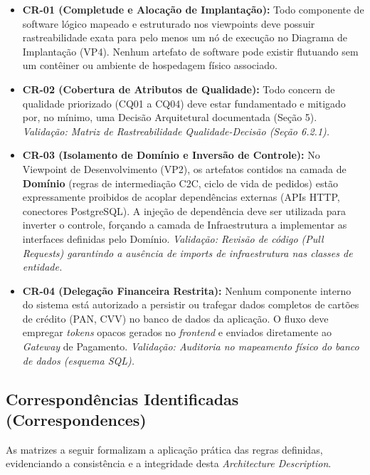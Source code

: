 \documentclass[12pt, a4paper]{article}
\begin{document}
\begin{itemize}[noitemsep]
    \item \textbf{CR-01 (Completude e Alocação de Implantação):} Todo componente de software lógico mapeado e estruturado nos viewpoints deve possuir rastreabilidade exata para pelo menos um nó de execução no Diagrama de Implantação (VP4). Nenhum artefato de software pode existir flutuando sem um contêiner ou ambiente de hospedagem físico associado. 
    
    \item \textbf{CR-02 (Cobertura de Atributos de Qualidade):} Todo concern de qualidade priorizado (CQ01 a CQ04) deve estar fundamentado e mitigado por, no mínimo, uma Decisão Arquitetural documentada (Seção 5). 
    \textit{Validação: Matriz de Rastreabilidade Qualidade-Decisão (Seção 6.2.1).}
    
    \item \textbf{CR-03 (Isolamento de Domínio e Inversão de Controle):} No Viewpoint de Desenvolvimento (VP2), os artefatos contidos na camada de \textbf{Domínio} (regras de intermediação C2C, ciclo de vida de pedidos) estão expressamente proibidos de acoplar dependências externas (APIs HTTP, conectores PostgreSQL). A injeção de dependência deve ser utilizada para inverter o controle, forçando a camada de Infraestrutura a implementar as interfaces definidas pelo Domínio.
    \textit{Validação: Revisão de código (\textit{Pull Requests}) garantindo a ausência de \textit{imports} de infraestrutura nas classes de entidade.}
    
    \item \textbf{CR-04 (Delegação Financeira Restrita):} Nenhum componente interno do sistema está autorizado a persistir ou trafegar dados completos de cartões de crédito (PAN, CVV) no banco de dados da aplicação. O fluxo deve empregar \textit{tokens} opacos gerados no \textit{frontend} e enviados diretamente ao \textit{Gateway} de Pagamento.
    \textit{Validação: Auditoria no mapeamento físico do banco de dados (esquema SQL).}
\end{itemize}

\subsection{Correspondências Identificadas (Correspondences)}

As matrizes a seguir formalizam a aplicação prática das regras definidas, evidenciando a consistência e a integridade desta \textit{Architecture Description}.
\end{document}

